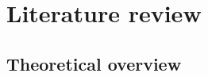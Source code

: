 \documentclass[12pt]{article}
\begin{document}



\section{Literature review}
\subsection{Theoretical overview}

\end{document}
